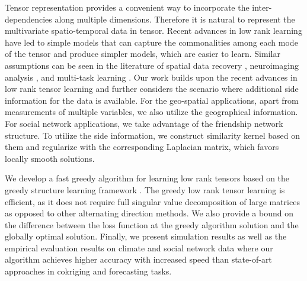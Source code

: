 Tensor representation provides a convenient way to incorporate the inter-dependencies along multiple dimensions. Therefore it is natural to represent the multivariate spatio-temporal data  in tensor.  Recent advances in low rank learning have led to simple models that can  capture the commonalities among each mode of the tensor and produce simpler models, which are easier to learn. Similar assumptions can be seen in the literature of spatial data recovery \cite{gandy2011tensor}, neuroimaging analysis \cite{zhou2013tensor}, and  multi-task learning \cite{romera2013multilinear}. Our work builds upon the recent advances in low rank tensor learning \cite{kolda2009tensor, gandy2011tensor, zhou2013tensor} and further considers the scenario where additional side information for the data is available. For the geo-spatial applications, apart from measurements of multiple variables, we also utilize the geographical information. For social network applications, we take advantage of the friendship network structure.  To utilize the side information, we construct similarity kernel based on them and regularize with the corresponding Laplacian matrix, which favors locally smooth solutions.

We develop a fast greedy algorithm for learning low rank tensors based on the greedy structure learning framework \cite{Barron2008,Zhang2011,Shwartz11}.  
The greedy low rank tensor learning is efficient, as it does not require full singular value decomposition of large matrices as opposed to other alternating direction methods. 
We also provide a bound on the difference between the loss function at the greedy algorithm solution and  the globally optimal solution. %
 Finally, we present simulation results as well as the empirical evaluation results on climate and social network data where our algorithm achieves higher accuracy with increased speed than state-of-art approaches in cokriging and forecasting tasks.

